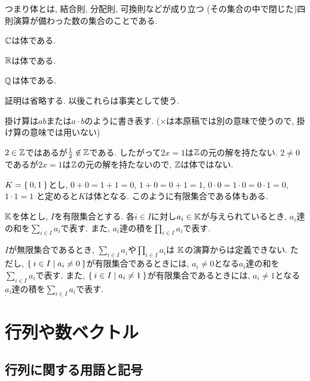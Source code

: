 \begin{remark}
  つまり体とは,
  結合則, 分配則, 可換則などが成り立つ
  (その集合の中で閉じた)四則演算が備わった数の集合のことである.
\end{remark}


\begin{example}
  $\mathbb{C}$は体である.
\end{example}
\begin{example}
  $\mathbb{R}$は体である.
\end{example}
\begin{example}
  $\mathbb{Q}$は体である.
\end{example}
\begin{remark}
  証明は省略する.
  以後これらは事実として使う.
\end{remark}
\begin{remark}
  掛け算は$ab$または$a\cdot b$のように書き表す.
  ($\times$は本原稿では別の意味で使うので,
  掛け算の意味では用いない)
\end{remark}

\begin{example}
  $2\in\mathbb{Z}$ではあるが$\frac{1}{2}\not\in \mathbb{Z}$である.
  したがって$2x=1$は$\mathbb{Z}$の元の解を持たない.
  $2\neq 0$であるが$2x=1$は$\mathbb{Z}$の元の解を持たないので,
  $\mathbb{Z}$は体ではない.
\end{example}

\begin{example}
$K=\Set{0,1}$とし,
$0+0=1+1=0$, $1+0=0+1=1$,
$0\cdot 0=1\cdot 0=0\cdot 1=0$, $1\cdot 1=1$
と定めると$K$は体となる.
このように有限集合である体もある.
\end{example}

$\mathbb{K}$を体とし,
$I$を有限集合とする.
各$i\in I$に対し$a_i\in \mathbb{K}$が与えられているとき,
$a_i$達の和を$\sum_{i\in I} a_i$で表す.
また,
$a_i$達の積を$\prod_{i\in I} a_i$で表す.

\begin{remark}
$I$が無限集合であるとき,
$\sum_{i\in I} a_i$や$\prod_{i\in I} a_i$は
$\mathbb{K}$の演算からは定義できない.
ただし,
$\Set{i \in I |a_i\neq 0}$が有限集合であるときには,
$a_i\neq 0$となる$a_i$達の和を$\sum_{i\in I} a_i$で表す.
また,
$\Set{i \in I |a_i\neq 1}$が有限集合であるときには,
$a_i\neq 1$となる$a_i$達の積を$\sum_{i\in I} a_i$で表す.
\end{remark}

\section{行列や数ベクトル}
\subsection{行列に関する用語と記号}

